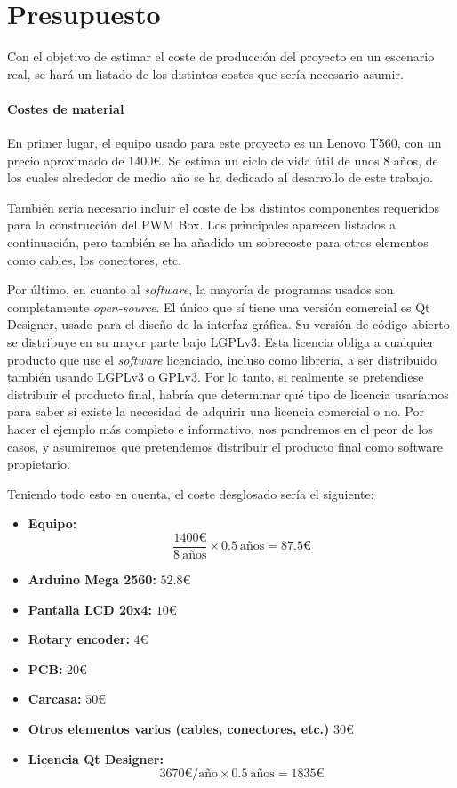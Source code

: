 \chapter{Presupuesto}

Con el objetivo de estimar el coste de producción del proyecto en un escenario real, se hará un listado de los distintos costes que sería necesario asumir.

\subsubsection{Costes de material}

En primer lugar, el equipo usado para este proyecto es un Lenovo T560, con un precio aproximado de 1400€. Se estima un ciclo de vida útil de unos 8 años, de los cuales alrededor de medio año se ha dedicado al desarrollo de este trabajo.

También sería necesario incluir el coste de los distintos componentes requeridos para la construcción del PWM Box. Los principales aparecen listados a continuación, pero también se ha añadido un sobrecoste para otros elementos como cables, los conectores, etc.

Por último, en cuanto al \textit{software}, la mayoría de programas usados son completamente \textit{open-source}. El único que sí tiene una versión comercial es Qt Designer, usado para el diseño de la interfaz gráfica. Su versión de código abierto se distribuye en su mayor parte bajo LGPLv3. Esta licencia obliga a cualquier producto que use el \textit{software} licenciado, incluso como librería, a ser distribuido también usando LGPLv3 o GPLv3. Por lo tanto, si realmente se pretendiese distribuir el producto final, habría que determinar qué tipo de licencia usaríamos para saber si existe la necesidad de adquirir una licencia comercial o no. Por hacer el ejemplo más completo e informativo, nos pondremos en el peor de los casos, y asumiremos que pretendemos distribuir el producto final como software propietario. \cite{qt-license} \cite{licenses}

Teniendo todo esto en cuenta, el coste desglosado sería el siguiente:

\begin{itemize}
    \item\textbf{Equipo:} \[\frac{1400\text{€}}{8\ \text{años}} \times 0.5\ \text{años} = 87.5\text{€} \]
    \item\textbf{Arduino Mega 2560:} $ 52.8\text{€} $
    \item\textbf{Pantalla LCD 20x4:} $ 10\text{€} $
    \item\textbf{Rotary encoder:} $ 4\text{€} $
    \item\textbf{PCB:} $ 20\text{€} $
    \item\textbf{Carcasa:} $ 50\text{€} $
    \item\textbf{Otros elementos varios (cables, conectores, etc.)} $ 30\text{€} $
    \item\textbf{Licencia Qt Designer:} \[ 3670\text{€/año} \times 0.5\ \text{años} = 1835\text{€} \]
\end{itemize}

